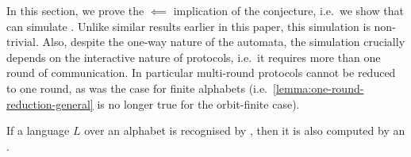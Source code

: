 In this section, we prove the $\impliedby$ implication of the conjecture, i.e.~we
show that  can simulate . Unlike similar results earlier in this paper, this simulation is
non-trivial. Also, despite the one-way nature of the automata, the simulation
crucially depends on the interactive nature of protocols, i.e.~it requires more
than one round of communication. In particular multi-round protocols cannot be
reduced to one round, as was the case for finite alphabets
(i.e.~\cref{lemma:one-round-reduction-general} is no longer true for the
orbit-finite case).

\begin{theorem}
    \label{thm:unambiguous-to-protocol}
    If a language $L$ over an  alphabet is recognised by 
    , then 
    it is also computed by an .
\end{theorem}
